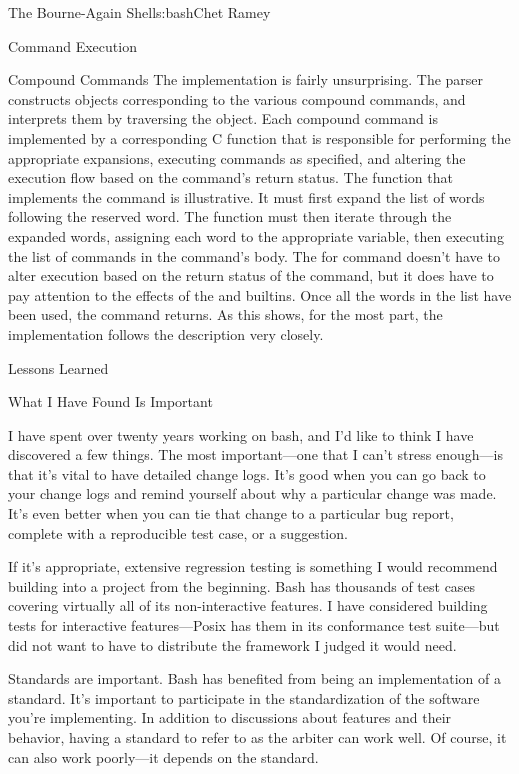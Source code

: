 \begin{aosachapter}{The Bourne-Again Shell}{s:bash}{Chet Ramey}
\begin{aosasect1}{Command Execution}
\begin{aosasect2}{Compound Commands}
The implementation is fairly unsurprising.  The parser constructs
objects corresponding to the various compound commands, and interprets
them by traversing the object.  Each compound command is implemented
by a corresponding C function that is responsible for performing the
appropriate expansions, executing commands as specified, and altering
the execution flow based on the command's return status.  The function
that implements the  command is illustrative.  It must first
expand the list of words following the  reserved word.  The
function must then iterate through the expanded words, assigning each
word to the appropriate variable, then executing the list of commands
in the  command's body.  The for command doesn't have to
alter execution based on the return status of the command, but it does
have to pay attention to the effects of the  and
 builtins.  Once all the words in the list have been
used, the  command returns.  As this shows, for the most
part, the implementation follows the description very closely.

\end{aosasect2}

\end{aosasect1}

\begin{aosasect1}{Lessons Learned}

\begin{aosasect2}{What I Have Found Is Important}

I have spent over twenty years working on bash, and I'd like to think
I have discovered a few things.
The most important---one that I can't stress enough---is that it's
vital to have detailed change logs.  It's good when you can go back to
your change logs and remind yourself about why a particular change was
made. It's even better when you can tie that change to a particular
bug report, complete with a reproducible test case, or a suggestion.

If it's appropriate, extensive regression testing is something I would
recommend building into a project from the beginning.  Bash has
thousands of test cases covering virtually all of its non-interactive
features. I have considered building tests for interactive
features---Posix has them in its conformance test suite---but did not
want to have to distribute the framework I judged it would need.

Standards are important.  Bash has benefited from being an
implementation of a standard.  It's important to participate in the
standardization of the software you're implementing.  In addition to
discussions about features and their behavior, having a standard to
refer to as the arbiter can work well.  Of course, it can also work poorly---it
depends on the standard.


\end{aosasect2}
\end{aosasect1}
\end{aosachapter}
